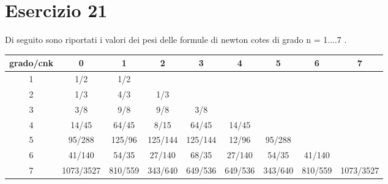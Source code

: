 \section{Esercizio 21}
Di seguito sono riportati i valori dei pesi delle formule di newton cotes di grado n = 1....7 .

\begin{table}[ht]
	\centering
	\small
	\begin{tabular}{| c| c | c| c | c |  c |  c |  c | c |}
	\hline
	grado/cnk & 0& 1 &2 &3&4&5&6&7\\
	\hline
	1 & 1/2 & 1/2 & & & & & & \\
	\hline
	2 & 1/3& 4/3 &1/3 & & & & &  \\
	\hline
	3 & 3/8 & 9/8 & 9/8 & 3/8  & & & &\\
	\hline
	4 & 14/45 & 64/45 & 8/15 & 64/45 & 14/45 & & &\\
	\hline
	5 & 95/288 & 125/96 &125/144 &125/144&12/96&95/288 && \\
	\hline
	6 &41/140& 54/35 &27/140 &68/35&27/140&54/35 &41/140 &\\
	\hline
	7 & 1073/3527 & 810/559 & 343/640 &649/536 &649/536&343/640&810/559  &1073/3527\\
	\hline
	
	\end{tabular}
\end{table}
